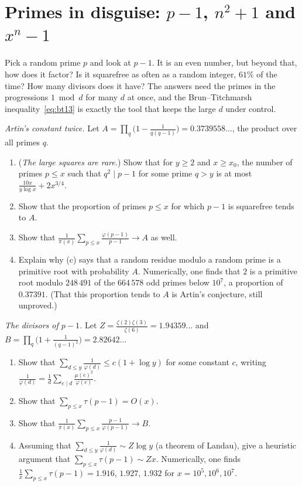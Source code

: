 \section{Primes in disguise: \texorpdfstring{$p-1$}{p-1}, \texorpdfstring{$n^2+1$}{n\^{}2+1} and \texorpdfstring{$x^n-1$}{x\^{}n-1}}

Pick a random prime $p$ and look at $p-1$. It is an even number, but beyond that, how does it factor? Is it squarefree as often as a random integer, $61\%$ of the time?
How many divisors does it have? The answers need the primes in the progressions $1\bmod d$ for many $d$ at once, and the Brun--Titchmarsh inequality~\eqref{eq:bt13}
is exactly the tool that keeps the large $d$ under control.

\begin{exercise}[$\star\star\star$]\label{pb:pminusone}
\emph{Artin's constant twice.} Let $A=\prod_q\bigl(1-\frac1{q(q-1)}\bigr)=0.3739558\ldots$, the product over all primes $q$.
\begin{enumerate}[label=(\alph*)]
\item (\emph{The large squares are rare.}) Show that for $y\ge2$ and $x\ge x_0$, the number of primes $p\le x$ such that $q^2\mid p-1$ for some prime $q>y$ is at most $\frac{10x}{y\log x}+2x^{3/4}$.
\item Show that the proportion of primes $p\le x$ for which $p-1$ is squarefree tends to $A$.
\item Show that $\frac1{\pi(x)}\sum_{p\le x}\frac{\varphi(p-1)}{p-1}\to A$ as well.
\item Explain why (c) says that a random residue modulo a random prime is a primitive root with probability $A$. Numerically, one finds that $2$ is a primitive root modulo
$248\,491$ of the $664\,578$ odd primes below $10^7$, a proportion of $0.37391$. (That this proportion tends to $A$ is Artin's conjecture, still unproved.)
\end{enumerate}
\end{exercise}

\begin{exercise}[$\star\star$]\label{pb:titchmarsh}
\emph{The divisors of $p-1$.} Let $Z=\frac{\zeta(2)\zeta(3)}{\zeta(6)}=1.94359\ldots$ and $B=\prod_q\bigl(1+\frac1{(q-1)^2}\bigr)=2.82642\ldots$
\begin{enumerate}[label=(\alph*)]
\item Show that $\sum_{d\le y}\frac1{\varphi(d)}\le c(1+\log y)$ for some constant $c$, writing $\frac1{\varphi(d)}=\frac1d\sum_{e\mid d}\frac{\mu(e)^2}{\varphi(e)}$.
\item Show that $\sum_{p\le x}\tau(p-1)=O(x)$.
\item Show that $\frac1{\pi(x)}\sum_{p\le x}\frac{p-1}{\varphi(p-1)}\to B$.
\item Assuming that $\sum_{d\le y}\frac1{\varphi(d)}\sim Z\log y$ (a theorem of Landau), give a heuristic argument that $\sum_{p\le x}\tau(p-1)\sim Zx$. Numerically, one finds
$\frac1x\sum_{p\le x}\tau(p-1)=1.916$, $1.927$, $1.932$ for $x=10^5,10^6,10^7$.
\end{enumerate}
\end{exercise}

